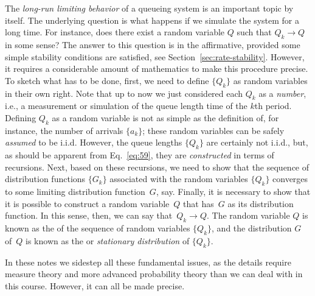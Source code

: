 The \emph{long-run limiting behavior} of a queueing system is an
important topic by itself. The underlying question is what happens if
we simulate the system for a long time. For instance, does there exist
a random variable $Q$ such that $Q_k\to Q$ in some sense? The answer
to this question is in the affirmative, provided some simple stability
conditions are satisfied, see
Section~\ref{sec:rate-stability}. However, it requires a considerable
amount of mathematics to make this procedure precise. To sketch what
has to be done, first, we need to define $\{Q_k\}$ as random variables
in their own right. Note that up to now we just considered each $Q_k$
as a \emph{number}, i.e., a measurement or simulation of the queue
length time of the $k$th period. Defining $Q_k$ as a random variable
is not as simple as the definition of, for instance, the number of
arrivals $\{a_k\}$; these random variables can be safely
\emph{assumed} to be i.i.d. However, the queue lengths $\{Q_k\}$ are
certainly not i.i.d., but, as should be apparent from
Eq.~\eqref{eq:59}, they are \emph{constructed} in terms of
recursions. Next, based on these recursions, we need to show that the
sequence of distribution functions $\{G_k\}$ associated with the
random variables $\{Q_k\}$ converges to some limiting distribution
function~$G$, say. Finally, it is necessary to show that it is
possible to construct a random variable~$Q$ that has~$G$ as its
distribution function.  In this sense, then, we can say
that~$Q_k \to Q$. The random variable $Q$ is known as the
 of the sequence of random variables
$\{Q_k\}$, and the distribution $G$ of~$Q$ is known as the
 or \emph{stationary distribution} of $\{Q_k\}$.

In these notes we sidestep all these fundamental issues, as the
details require measure theory and more advanced probability theory
than we can deal with in this course. However, it can all be made
precise. 

